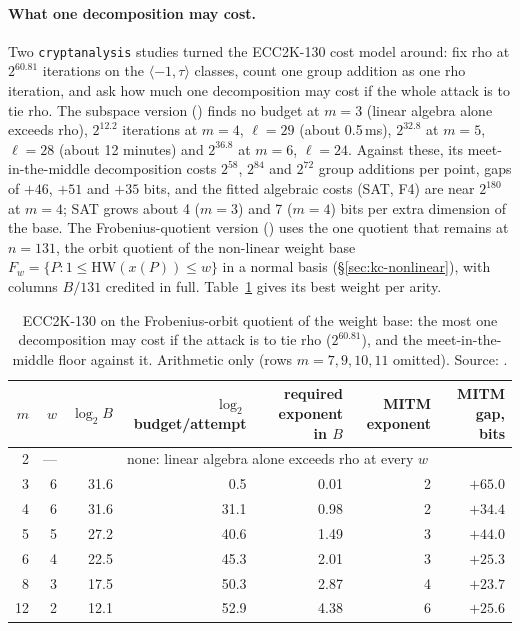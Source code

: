 \paragraph{What one decomposition may cost.} Two \texttt{cryptanalysis}
studies turned the ECC2K-130 cost model around: fix rho at $2^{60.81}$
iterations on the $\langle-1,\tau\rangle$ classes, count one group addition
as one rho iteration, and ask how much one decomposition may cost if the
whole attack is to tie rho. The subspace version
() finds no budget at
$m=3$ (linear algebra alone exceeds rho), $2^{12.2}$ iterations at $m=4$,
$\ell=29$ (about 0.5\,ms), $2^{32.8}$ at $m=5$, $\ell=28$ (about 12 minutes)
and $2^{36.8}$ at $m=6$, $\ell=24$. Against these, its meet-in-the-middle
decomposition costs $2^{58}$, $2^{84}$ and $2^{72}$ group additions per
point, gaps of $+46$, $+51$ and $+35$ bits, and the fitted algebraic costs
(SAT, F4) are near $2^{180}$ at $m=4$; SAT grows about 4 ($m=3$) and 7 ($m=4$)
bits per extra dimension of the base. The Frobenius-quotient version
() uses the
one quotient that remains at $n=131$, the orbit quotient of the non-linear
weight base $F_w=\{P: 1\le\mathrm{HW}(x(P))\le w\}$ in a normal basis
(\S\ref{sec:kc-nonlinear}), with columns $B/131$ credited in full.
Table~\ref{tab:bt-fq} gives its best weight per arity.

\begin{table}[t]
\centering\small
\begin{tabular}{@{}rrrrrrr@{}}
\toprule
$m$ & $w$ & $\log_2B$ & $\log_2$ budget/attempt & required exponent in $B$ & MITM exponent & MITM gap, bits \\
\midrule
2 & --- & & \multicolumn{4}{l}{none: linear algebra alone exceeds rho at every $w$} \\
3 & 6 & 31.6 & 0.5 & 0.01 & 2 & $+65.0$ \\
4 & 6 & 31.6 & 31.1 & 0.98 & 2 & $+34.4$ \\
5 & 5 & 27.2 & 40.6 & 1.49 & 3 & $+44.0$ \\
6 & 4 & 22.5 & 45.3 & 2.01 & 3 & $+25.3$ \\
8 & 3 & 17.5 & 50.3 & 2.87 & 4 & $+23.7$ \\
12 & 2 & 12.1 & 52.9 & 4.38 & 6 & $+25.6$ \\
\bottomrule
\end{tabular}
\caption[]{ECC2K-130 on the Frobenius-orbit quotient of the weight base:
the most one decomposition may cost if the attack is to tie rho
($2^{60.81}$), and the meet-in-the-middle floor against it. Arithmetic
only (rows $m=7,9,10,11$ omitted). Source:
.}
\label{tab:bt-fq}
\end{table}

